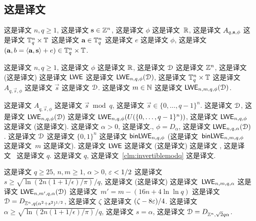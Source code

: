 \subsection{这是译文}
\label{sec:computational_problems}

这是译文 $n,q \ge 1$, 这是译文 $\mathbf{s}
\in \mathbb{Z}^n$, 这是译文 $\phi$ 这是译文~$\mathbb{R}$, 这是译文 $A_{q,\mathbf{s}, \phi}$ 这是译文 $\mathbb{T}_q^n \times \mathbb{T}$ 这是译文 $\mathbf{a} \in \mathbb{T}_q^n$ 这是译文 $e$ 这是译文 $\phi$, 这是译文 $(\mathbf{a}, b =
\langle\mathbf{a}, \mathbf{s}\rangle+e) \in \mathbb{T}_q^n \times \mathbb{T}$.

\begin{definition}
  \label{def:lwe}  这是译文 $n,q \ge 1$, 这是译文 $\phi$  这是译文 $\mathbb{R}$, 这是译文 $\mathcal{D}$ 这是译文 $\mathbb{Z}^n$, 这是译文 (这是译文) 这是译文 $\mathsf{LWE}$  这是译文 $\mathsf{LWE}_{n,q,\phi}(\mathcal{D})$, 这是译文 $\mathbb{T}_q^n \times \mathbb{T}$ 这是译文  $A_{q,\vec{s},\phi}$ 这是译文 $\vec{s}$ 这是译文 $\mathcal{D}$. 这是译文 $m\in{\mathbb N}$ 这是译文 $\mathsf{LWE}_{n,m,q,\phi}(\mathcal{D})$.
\end{definition}

这是译文 $A_{q,\vec{s},\phi}$ 这是译文 $\vec{s} \bmod q$, 这是译文 $\vec{s} \in \{0,\ldots,q-1\}^n$. 这是译文 $\mathcal{D}$, 这是译文 $\mathsf{LWE}_{n,q,\phi}(\mathcal{D})$ 这是译文 $\mathsf{LWE}_{n,q,\phi}(U(\{0,\ldots,q-1\}^n))$, 这是译文 $\mathsf{LWE}_{n,q,\phi}$ 这是译文 (这是译文).  这是译文 $\alpha>0$, 这是译文., $\phi=D_\alpha$, 这是译文 $\mathsf{LWE}_{n,q,\alpha}(\mathcal{D})$. 这是译文 $\mathcal{D}$ 这是译文 $\{0,1\}^n$ 这是译文 $\mathsf{binLWE}_{n,q,\phi}$ (这是译文~$\mathsf{binLWE}_{n,m,q,\phi}$ 这是译文~$m$ 这是译文). 这是译文 $\mathsf{LWE}$ 这是译文 (这是译文) 这是译文 \lwe, 这是译文~\cite{DBLP:conf/crypto/ApplebaumCPS09} 这是译文 $q$. 这是译文 $q$, 这是译文~\ref{clm:invertiblemodq} 这是译文.

\begin{lemma}\label{lem:normalform}  这是译文 $q \ge 25$, $n,m \geq 1$, $\alpha>0$, $\varepsilon < 1/2$ 这是译文~$s \geq
  \sqrt{\ln(2n(1+1/\epsilon)/\pi)}/q$, 这是译文  (这是译文) 这是译文~$\mathsf{LWE}_{n,m,q,\alpha}$ 这是译文  $\mathsf{LWE}_{n,m',q,\alpha}(\mathcal{D})$  这是译文~$m' = m - (16n + 4\ln \ln q)$ 这是译文 $\mathcal{D}=D_{\mathbb{Z}^n,q(\alpha^2+s^2)^{1/2}}$, 这是译文 $\zeta$ 这是译文 $(\zeta-8\varepsilon)/4$.  这是译文 $\alpha \geq \sqrt{\ln(2n(1+1/\epsilon)/\pi)}/q$, 这是译文 $s=\alpha$,  这是译文 $\mathcal{D}=D_{\mathbb{Z}^n,\sqrt{2}q\alpha}$.
\end{lemma}


